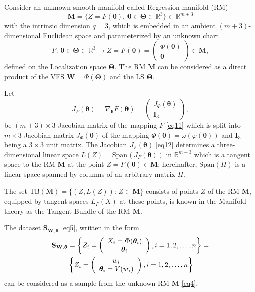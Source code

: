 \documentclass[conference]{IEEEtran} %
\def\mbW{\mathbf{W}}
\def\mbTheta{{\bm\Theta}}
\def\mbtheta{{\bm\theta}}
\def\mbM{\mathbf{M}}
\def\mbS{\mathbf{S}}
\def\RR{\mathbb{R}}
\begin{document}
Consider an unknown smooth manifold called Regression manifold (RM)
\begin{equation}
\label{eq10}
	\mbM = \{Z=F(\mbtheta),\,\mbtheta\in\mbTheta\subset\RR^3\}\subset\RR^{m+3}
\end{equation}
with the intrinsic dimension $q = 3$, which is embedded in an ambient $(m+3)$-dimensional Euclidean space and parameterized by an unknown chart
\begin{equation}
\label{eq11}
F:\,\mbtheta\in\mbTheta\subset\RR^3\to Z = F(\mbtheta) =
\left(
\begin{array}{c}
\Phi(\mbtheta)\\
\mbtheta
\end{array}
\right)
\in\mbM,
\end{equation}
defined on the Localization space $\mbTheta$.
The RM $\mbM$ can be considered as a direct product of the VFS $\mbW = \Phi(\mbTheta)$ and the LS $\mbTheta$.

Let
\begin{equation}
\label{eq12}
J_F(\mbtheta) = \nabla_{\mbtheta}F(\mbtheta) =
\left(
\begin{array}{c}
J_{\Phi}(\mbtheta)\\
\mathbf{I}_3
\end{array}
\right),
\end{equation}
be $(m+3)\times 3$ Jacobian matrix of the mapping $F$ \eqref{eq11} which is split into $m\times 3$ Jacobian matrix $J_{\Phi}(\mbtheta)$ of the mapping $\Phi(\mbtheta) = \omega(\varphi(\mbtheta))$ and $\mathbf{I}_3$ being a $3\times3$ unit matrix. The Jacobian $J_F(\mbtheta)$ \eqref{eq12} determines a three-dimensional linear space $L(Z) = \mathrm{Span}(J_F(\mbtheta))$ in $\RR^{m+3}$ which is a tangent space to the RM $\mbM$ at the point $Z = F(\mbtheta) \in\mbM$; hereinafter, $\mathrm{Span}(H)$ is a linear space spanned by columns of an arbitrary matrix $H$.

The set $\mathrm{TB}(\mbM) = \{(Z, L(Z)):\, Z \in \mbM\}$ consists of points $Z$ of the RM $\mbM$, equipped by tangent spaces $L_F(X)$ at these points, is known in the Manifold theory \cite{bib25} as the Tangent Bundle of the RM $\mbM$.

The dataset $\mbS_{\mathbf{W},\mbtheta}$ \eqref{eq5}, written in the form
\begin{align}
    \mbS_{\mathbf{W},\mbtheta}
    &= \left\{Z_i=
    \left(
    \begin{array}{c}
    X_i = \Phi(\mbtheta_i)\\
    \mbtheta_i
    \end{array}
    \right), i = 1,2,\ldots,n\right\}=\notag\\
    &\left\{Z_i=
    \left(
    \begin{array}{c}
    w_i\\
    \mbtheta_i = V(w_i)
    \end{array}
    \right), i = 1,2,\ldots,n\right\}
    	\label{eq13}
\end{align}
can be considered as a sample from the unknown RM $\mbM$ \eqref{eq4}.
\end{document}
